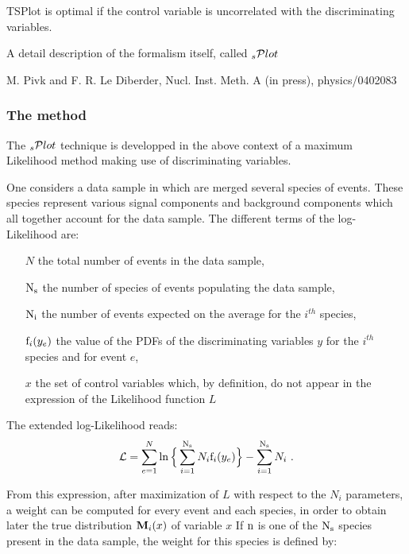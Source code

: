 \documentclass[11pt]{article}
\begin{document}
TSPlot is optimal if the control variable is uncorrelated with the discriminating variables.




A detail description of the formalism itself, called 
 $\hbox{$_s$}{\cal P}lot$
 

M. Pivk and F. R. Le Diberder, Nucl. Inst. Meth. A (in press), physics/0402083




\subsubsection{The method}




The  $\hbox{$_s$}{\cal P}lot$ technique is developped in the above context of a maximum Likelihood method making use of discriminating variables.



One considers a data sample in which are merged several species
of events. These species represent various signal components and
background components which all together account for the data sample.
The different terms of the log-Likelihood are:

\begin{itemize}
 \item[$N$] the total number of events in the data sample,
 \item[${\rm N}_{\rm s}$] the number of species of events populating the data sample,
 \item[${\rm N}_{\rm i}$] the number of events expected on the average for the $i^{th}$ species,
 \item[${\rm f}_i(y_e)$] the value of the PDFs of the discriminating variables $y$ for the $i^{th}$ species and for event $e$, 
 \item[$x$] the set of control variables which, by definition, do not appear in the expression of the Likelihood function $L$
\end{itemize}

The extended log-Likelihood reads:
 \begin{equation}
{\cal L}=\sum_{e=1}^{N}\ln \Big\{ \sum_{i=1}^{{\rm N}_{\rm s}}N_i{\rm f}_i(y_e) \Big\} -\sum_{i=1}^{{\rm N}_{\rm s}}N_i ~.
\end{equation}

From this expression, after maximization of $L$ with respect to the $N_i$ parameters, a weight can be computed for every event and each species, in order to obtain later the true distribution  ${\hbox{\bf {M}}}_i(x)$ of variable $x$  If ${\rm n}$ is one of the 
 ${\rm N}_{\rm s}$ species present in the data sample, the weight for this species is defined by:
\end{document}

